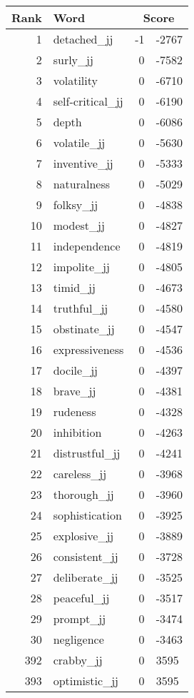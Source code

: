 \begin{longtable}[!htbp]{| rlr@{.}l |}
    \hline
    \textbf{Rank} & \textbf{Word} & \multicolumn{2}{c|}{\textbf{Score}} \\
    \hline
    \endhead
    1 & detached\_jj & -1 & -2767 \\
    2 & surly\_jj & 0 & -7582 \\
    3 & volatility & 0 & -6710 \\
    4 & self-critical\_jj & 0 & -6190 \\
    5 & depth & 0 & -6086 \\
    6 & volatile\_jj & 0 & -5630 \\
    7 & inventive\_jj & 0 & -5333 \\
    8 & naturalness & 0 & -5029 \\
    9 & folksy\_jj & 0 & -4838 \\
    10 & modest\_jj & 0 & -4827 \\
    11 & independence & 0 & -4819 \\
    12 & impolite\_jj & 0 & -4805 \\
    13 & timid\_jj & 0 & -4673 \\
    14 & truthful\_jj & 0 & -4580 \\
    15 & obstinate\_jj & 0 & -4547 \\
    16 & expressiveness & 0 & -4536 \\
    17 & docile\_jj & 0 & -4397 \\
    18 & brave\_jj & 0 & -4381 \\
    19 & rudeness & 0 & -4328 \\
    20 & inhibition & 0 & -4263 \\
    21 & distrustful\_jj & 0 & -4241 \\
    22 & careless\_jj & 0 & -3968 \\
    23 & thorough\_jj & 0 & -3960 \\
    24 & sophistication & 0 & -3925 \\
    25 & explosive\_jj & 0 & -3889 \\
    26 & consistent\_jj & 0 & -3728 \\
    27 & deliberate\_jj & 0 & -3525 \\
    28 & peaceful\_jj & 0 & -3517 \\
    29 & prompt\_jj & 0 & -3474 \\
    30 & negligence & 0 & -3463 \\
    392 & crabby\_jj & 0 & 3595 \\
    393 & optimistic\_jj & 0 & 3595 \\

\end{longtable}
